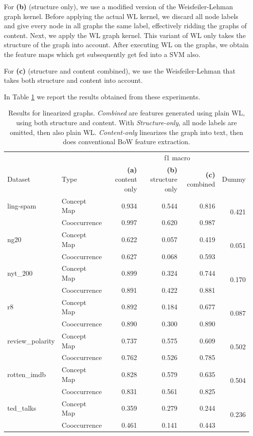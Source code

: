 For \textbf{(b)} (structure only), we use a modified version of the Weisfeiler-Lehman graph kernel. Before applying the actual WL kernel, we discard all node labels and give every node in all graphs the same label, effectively ridding the graphs of content. Next, we apply the WL graph kernel. This variant of WL only takes the structure of the graph into account.
After executing WL on the graphs, we obtain the feature maps which get subsequently get fed into a SVM also.

For \textbf{(c)} (structure and content combined), we use the Weisfeiler-Lehman that takes both structure and content into account.

In Table \ref{table:table_results_structure_vs_content} we report the results obtained from these experiments.

\begin{table}[htb!]
\centering
\begin{tabular}{llrrr|r}
\toprule
          & & \multicolumn{4}{c}{f1 macro} \\
Dataset & Type & \textbf{(a)} content only & \textbf{(b)} structure only & \textbf{(c)} combined & Dummy\\
\midrule
ling-spam & Concept Map & 0.934 & 0.544 & 0.816 & \multirow{2}{*}{0.421} \\
& Cooccurrence & 0.997 & 0.620 & 0.987 & \\
\midrule
ng20 & Concept Map & 0.622 & 0.057 & 0.419 & \multirow{2}{*}{0.051} \\
& Cooccurrence & 0.627 & 0.068 & 0.593 & \\
\midrule
nyt\_200 & Concept Map & 0.899 & 0.324 & 0.744 & \multirow{2}{*}{0.170} \\
& Cooccurrence & 0.891 & 0.422 & 0.881 & \\
\midrule
r8 & Concept Map & 0.892 & 0.184 & 0.677 & \multirow{2}{*}{0.087} \\
& Cooccurrence & 0.890 & 0.300 & 0.890 & \\
\midrule
review\_polarity & Concept Map & 0.737 & 0.575 & 0.609 & \multirow{2}{*}{0.502} \\
& Cooccurrence & 0.762 & 0.526 & 0.785 & \\
\midrule
rotten\_imdb & Concept Map & 0.828 & 0.579 & 0.635 & \multirow{2}{*}{0.504} \\
& Cooccurrence & 0.831 & 0.561 & 0.825 & \\
\midrule
ted\_talks & Concept Map & 0.359 & 0.279 & 0.244 & \multirow{2}{*}{0.236} \\
& Cooccurrence & 0.461 & 0.141 & 0.443 & \\
\bottomrule
\end{tabular}
\caption[Results: Linearized vs. WL]{Results for linearized graphs. \textit{Combined} are features generated using plain WL, using both structure and content. With \textit{Structure-only}, all node labels are omitted, then also plain WL. \textit{Content-only} linearizes the graph into text, then does conventional BoW feature extraction.}\label{table:table_results_structure_vs_content}
\end{table}

